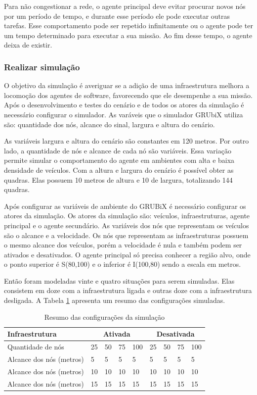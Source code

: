 Para não congestionar a rede, o agente principal deve evitar procurar novos nós por um período de tempo, e durante esse período ele pode executar outras tarefas. Esse comportamento pode ser repetido infinitamente ou o agente pode ter um tempo determinado para executar a sua missão. Ao fim desse tempo, o agente deixa de existir.

\subsubsection{Realizar simulação}

O objetivo da simulação é averiguar se a adição de uma infraestrutura melhora a locomoção dos agentes de software, favorecendo que ele desempenhe a sua missão. Após o desenvolvimento e testes do cenário e de todos os atores da simulação é necessário configurar o simulador. As varáveis que o simulador GRUbiX utiliza são: quantidade dos nós, alcance do sinal, largura e altura do cenário. 

As variáveis largura e altura do cenário são constantes em 120 metros. Por outro lado, a quantidade de nós e alcance de cada nó são variáveis. Essa variação permite simular o comportamento do agente em ambientes com alta e baixa densidade de veículos. Com a altura e largura do cenário é possível obter as quadras. Elas possuem 10 metros de altura e 10 de largura, totalizando 144 quadras.

Após configurar as variáveis de ambiente do GRUBiX é necessário configurar os atores da simulação. Os atores da simulação são: veículos, infraestruturas, agente principal e o agente secundário. As variáveis dos nós que representam os veículos são o alcance e a velocidade. Os nós que representam as infraestruturas possuem o mesmo alcance dos veículos, porém a velocidade é nula e também podem ser ativados e desativados. O agente principal só precisa conhecer a região alvo, onde o ponto superior é S(80,100) e o inferior é I(100,80) sendo a escala em metros.  

Então foram modeladas vinte e quatro situações para serem simuladas. Elas consistem em doze com a infraestrutura ligada e outras doze com a infraestrutura desligada. A Tabela \ref{tab:resumoConfiguracaoSimulacao} apresenta um resumo das configurações simuladas. 

\begin{table}[ht]
	\caption{Resumo das configurações da simulação}
	\centering
	\begin{tabular}{| l | l | l | l | l | l | l | l | l |}
		\hline
		Infraestrutura & \multicolumn{4}{|c|}{Ativada} & \multicolumn{4}{|c|}{Desativada} \\ \hline
		Quantidade de nós & 25 & 50 & 75 & 100 & 25 & 50 & 75 & 100 \\ \hline
		Alcance dos nós (metros) & 5 & 5 & 5 & 5 & 5 & 5 & 5 & 5 \\
		Alcance dos nós (metros)& 10 & 10 & 10 & 10 & 10 & 10 & 10 & 10 \\
		Alcance dos nós (metros)& 15 & 15 & 15 & 15 & 15 & 15 & 15 & 15 \\
		\hline 
	\end{tabular}
	\label{tab:resumoConfiguracaoSimulacao}
\end{table}

